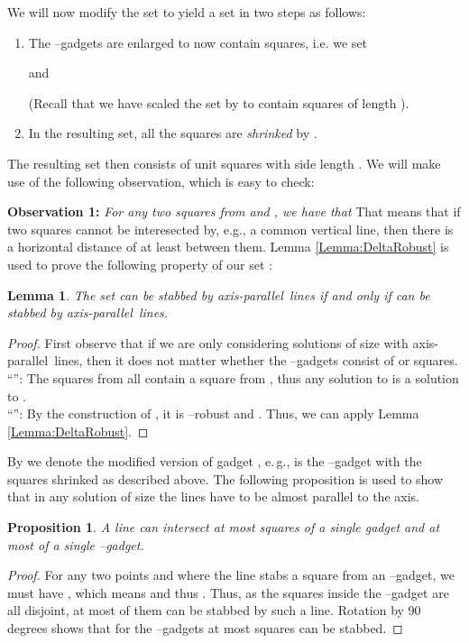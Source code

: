\documentclass[12pt]{article}
\newtheorem{lemma}[definition]{Lemma}
\newtheorem{proposition}[definition]{Proposition}
\newcommand{\ap}{a.p.\ }
\renewcommand{\ap}{axis-parallel\ }
\begin{document}
We will now modify the set  to yield a set  in two steps as follows:
\begin{enumerate}
	\item The --gadgets are enlarged to now contain  squares, i.e. we set
	
	and
	
        (Recall that we have scaled the set  by  to contain squares of length ).
	\item In the resulting set, all the squares are \emph{shrinked} by .
\end{enumerate}

The resulting set then consists of unit squares with side length . 
We will make use of the following observation, which is easy to check:

\textbf{Observation 1: }\emph{For any two squares  from  and , we have that  }
That means that if two squares cannot be interesected by, e.g., a common vertical line, then there is a horizontal distance of at least  between them.
Lemma \ref{Lemma:DeltaRobust} is used to prove the following property of our set :
\begin{lemma}\label{Lemma:ShrinkingLemma}
The set  can be stabbed by  \ap lines if and only if  can be stabbed by  \ap lines.
\end{lemma}
\begin{proof}
First observe that if we are only considering solutions of size  with \ap lines, then it does not matter whether the --gadgets consist of  or  squares.\\
``'': The squares from  all contain a square from , thus any solution to  is a solution to .\\
``'': By the construction of , it is --robust and . Thus, we can apply Lemma \ref{Lemma:DeltaRobust}. 
\end{proof}
By  we denote the modified version of gadget , e.\,g.,  is the --gadget with the squares shrinked as described above. The following proposition is used to show that in any solution of size  the lines have to be almost parallel to the axis. 
\begin{proposition}\label{Proposition:MaxStab}
A line  can intersect at most  squares of a single  gadget and at most  of a single --gadget.
\end{proposition}
\begin{proof} For any two points  and  where the line stabs a square from an --gadget, we must have , which means  and thus . Thus, as the squares inside the --gadget are all disjoint, at most  of them can be stabbed by such a line. Rotation by 90 degrees shows that for the --gadgets at most  squares can be stabbed.

\end{proof}
\end{document}
